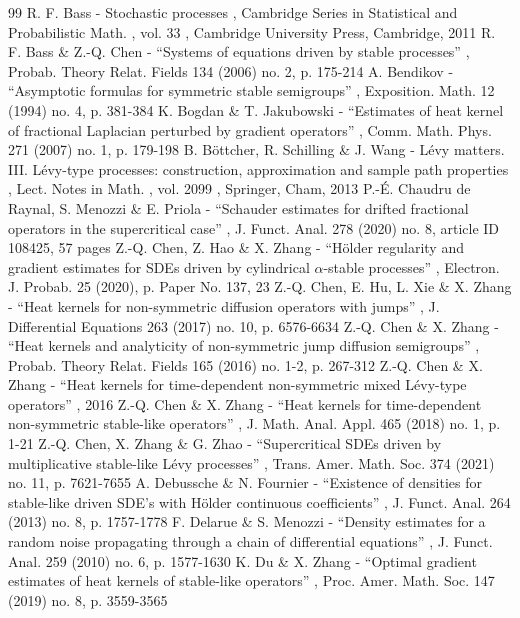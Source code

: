 \documentclass[11pt]{article}
\numberwithin{equation}{section}\providecommand{\asymp}{\mathrel{\sim}}
\theoremstyle{plain}
\theoremstyle{definition}
\newcommand\1{{\mathbf{1}}}
\begin{document}
\begin{thebibliography}{99}
 R. F. Bass - Stochastic processes , Cambridge Series in Statistical and Probabilistic Math. , vol. 33 , Cambridge University Press, Cambridge, 2011
 R. F. Bass \& Z.-Q. Chen - “Systems of equations driven by stable processes” , Probab. Theory Relat. Fields 134 (2006) no. 2, p. 175-214
 A. Bendikov - “Asymptotic formulas for symmetric stable semigroups” , Exposition. Math. 12 (1994) no. 4, p. 381-384
 K. Bogdan \& T. Jakubowski - “Estimates of heat kernel of fractional Laplacian perturbed by gradient operators” , Comm. Math. Phys. 271 (2007) no. 1, p. 179-198
 B. Böttcher, R. Schilling \& J. Wang - Lévy matters. III. Lévy-type processes: construction, approximation and sample path properties , Lect. Notes in Math. , vol. 2099 , Springer, Cham, 2013
 P.-É. Chaudru de Raynal, S. Menozzi \& E. Priola - “Schauder estimates for drifted fractional operators in the supercritical case” , J. Funct. Anal. 278 (2020) no. 8, article ID 108425, 57 pages
 Z.-Q. Chen, Z. Hao \& X. Zhang - “Hölder regularity and gradient estimates for SDEs driven by cylindrical $\alpha $-stable processes” , Electron. J. Probab. 25 (2020), p. Paper No. 137, 23
 Z.-Q. Chen, E. Hu, L. Xie \& X. Zhang - “Heat kernels for non-symmetric diffusion operators with jumps” , J. Differential Equations 263 (2017) no. 10, p. 6576-6634
 Z.-Q. Chen \& X. Zhang - “Heat kernels and analyticity of non-symmetric jump diffusion semigroups” , Probab. Theory Relat. Fields 165 (2016) no. 1-2, p. 267-312
 Z.-Q. Chen \& X. Zhang - “Heat kernels for time-dependent non-symmetric mixed Lévy-type operators” , 2016
 Z.-Q. Chen \& X. Zhang - “Heat kernels for time-dependent non-symmetric stable-like operators” , J. Math. Anal. Appl. 465 (2018) no. 1, p. 1-21
 Z.-Q. Chen, X. Zhang \& G. Zhao - “Supercritical SDEs driven by multiplicative stable-like Lévy processes” , Trans. Amer. Math. Soc. 374 (2021) no. 11, p. 7621-7655
 A. Debussche \& N. Fournier - “Existence of densities for stable-like driven SDE’s with Hölder continuous coefficients” , J. Funct. Anal. 264 (2013) no. 8, p. 1757-1778
 F. Delarue \& S. Menozzi - “Density estimates for a random noise propagating through a chain of differential equations” , J. Funct. Anal. 259 (2010) no. 6, p. 1577-1630
 K. Du \& X. Zhang - “Optimal gradient estimates of heat kernels of stable-like operators” , Proc. Amer. Math. Soc. 147 (2019) no. 8, p. 3559-3565

\end{thebibliography}
\end{document}
